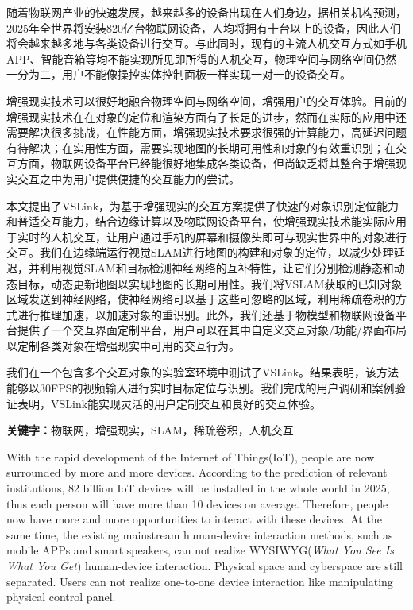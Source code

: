 \cleardoublepage
{}
随着物联网产业的快速发展，越来越多的设备出现在人们身边，据相关机构预测，2025年全世界将安装820亿台物联网设备，人均将拥有十台以上的设备，因此人们将会越来越多地与各类设备进行交互。与此同时，现有的主流人机交互方式如手机APP、智能音箱等均不能实现所见即所得的人机交互，物理空间与网络空间仍然一分为二，用户不能像操控实体控制面板一样实现一对一的设备交互。

增强现实技术可以很好地融合物理空间与网络空间，增强用户的交互体验。目前的增强现实技术在在对象的定位和渲染方面有了长足的进步，然而在实际的应用中还需要解决很多挑战，在性能方面，增强现实技术要求很强的计算能力，高延迟问题有待解决；在实用性方面，需要实现地图的长期可用性和对象的有效重识别；在交互方面，物联网设备平台已经能很好地集成各类设备，但尚缺乏将其整合于增强现实交互之中为用户提供便捷的交互能力的尝试。

本文提出了VSLink，为基于增强现实的交互方案提供了快速的对象识别定位能力和普适交互能力，结合边缘计算以及物联网设备平台，使增强现实技术能实际应用于实时的人机交互，让用户通过手机的屏幕和摄像头即可与现实世界中的对象进行交互。我们在边缘端运行视觉SLAM进行地图的构建和对象的定位，以减少处理延迟，并利用视觉SLAM和目标检测神经网络的互补特性，让它们分别检测静态和动态目标，动态更新地图以实现地图的长期可用性。我们将VSLAM获取的已知对象区域发送到神经网络，使神经网络可以基于这些可忽略的区域，利用稀疏卷积的方式进行推理加速，以加速对象的重识别。此外，我们还基于物模型和物联网设备平台提供了一个交互界面定制平台，用户可以在其中自定义交互对象/功能/界面布局以定制各类对象在增强现实中可用的交互行为。

我们在一个包含多个交互对象的实验室环境中测试了VSLink。结果表明，该方法能够以30FPS的视频输入进行实时目标定位与识别。我们完成的用户调研和案例验证表明，VSLink能实现灵活的用户定制交互和良好的交互体验。

\noindent\textbf{关键字：}物联网，增强现实，SLAM，稀疏卷积，人机交互

\cleardoublepage
{}
With the rapid development of the Internet of Things(IoT), people are now surrounded by more and more devices. According to the prediction of relevant institutions, 82 billion IoT devices will be installed in the whole world in 2025, thus each person will have more than 10 devices on average. Therefore, people now have more and more opportunities to interact with these devices. At the same time, the existing mainstream human-device interaction methods, such as mobile APPs and smart speakers, can not realize WYSIWYG(\textit{What You See Is What You Get}) human-device interaction. Physical space and cyberspace are still separated. Users can not realize one-to-one device interaction like manipulating physical control panel. 

